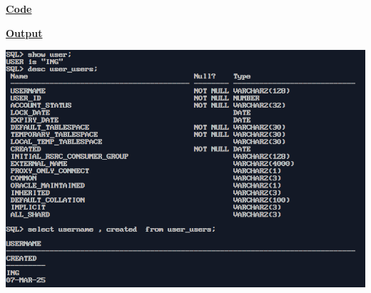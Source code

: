 \newpage
{}
\textbf{\underline{Code}}


\vspace{1cm}
\textbf{\underline{Output}}
\vspace{1cm}
\begin{center}
    \includegraphics[height=0.5\textheight]{Questions/q2/q2.png}
\end{center}



